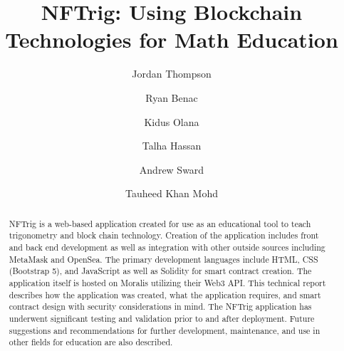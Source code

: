 \documentclass[acmsmall,nonacm]{acmart}
\begin{document}
\title{NFTrig: Using Blockchain Technologies for Math Education}

\author{Jordan Thompson}
  
\author{Ryan Benac}

\author{Kidus Olana}
  
\author{Talha Hassan}

\author{Andrew Sward}

\author{Tauheed Khan Mohd}


\begin{abstract}
NFTrig is a web-based application created for use as an educational tool to teach trigonometry and block chain technology. Creation of the application includes front and back end development as well as integration with other outside sources including MetaMask and OpenSea. The primary development languages include HTML, CSS (Bootstrap 5), and JavaScript as well as Solidity for smart contract creation. The application itself is hosted on Moralis utilizing their Web3 API. This technical report describes how the application was created, what the application requires, and smart contract design with security considerations in mind. The NFTrig application has underwent significant testing and validation prior to and after deployment. Future suggestions and recommendations for further development, maintenance, and use in other fields for education are also described. 
\end{abstract}
\end{document}
